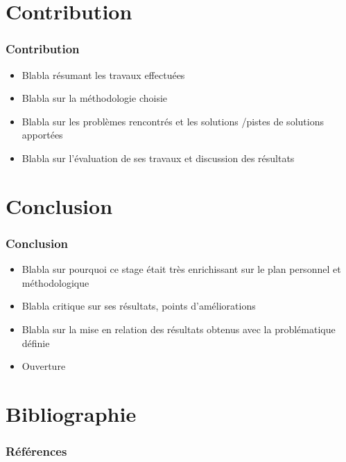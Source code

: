 \documentclass[9pt,french,xcolor=table]{beamer}
\begin{document}
\section{Contribution}
    \begin{frame}[c]
        \frametitle{\vspace*{0.45cm} \huge \bf Contribution}
        \begin{itemize}
            \item Blabla résumant les travaux effectuées 
            \item Blabla sur la méthodologie choisie
            \item Blabla sur les problèmes rencontrés et les solutions /pistes de solutions apportées
            \item Blabla sur l'évaluation de ses travaux et discussion des résultats
        \end{itemize}
    \end{frame}
        
\section{Conclusion}
    \begin{frame}[c]
        \frametitle{\vspace*{0.45cm} \huge \bf Conclusion}
        \vspace*{0.5cm}
        \begin{itemize}
            \item Blabla sur pourquoi ce stage était très enrichissant sur le plan personnel et méthodologique
            \item Blabla critique sur ses résultats, points d'améliorations
            \item Blabla sur la mise en relation des résultats obtenus avec la problématique définie
            \item Ouverture
        \end{itemize}
    \end{frame}
    
\section{Bibliographie}
    \begin{frame}[allowframebreaks]
        \frametitle{\vspace*{0.45cm} \huge \bf Références}
        \vspace*{0.5cm}
        \nocite{*}
        
        
    \end{frame}    
\end{document}
